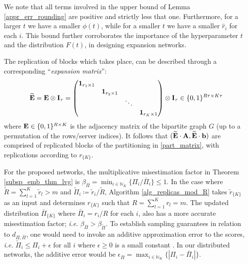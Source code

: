 \documentclass[journal,letterpaper,onecolumn,twoside,nofonttune]{IEEEtran}
\newcommand{\N}{\mathbb{N}}
\newcommand{\R}{\mathbb{R}}
\newcommand{\bb}{\bold{b}}
\newcommand{\Ab}{\bold{A}}
\newcommand{\Eb}{\bold{E}}
\newcommand{\Ebwt}{\widetilde{\bold{E}}}
\newcommand{\Ib}{\bold{I}}
\newcommand{\Rt}{\tilde{R}}
\newcommand{\rh}{\hat{r}}
\newcommand{\rt}{\tilde{r}}
\newcommand{\Pib}{\bar{\Pi}}
\newcommand{\Pit}{\tilde{\Pi}}
\begin{document}
We note that all terms involved in the upper bound of Lemma \ref{appr_err_rounding} are positive and strictly less that one. Furthermore, for a larger $t$ we have a smaller $\phi(t)$, while for a smaller $t$ we have a smaller $\rh_i$ for each $i$. This bound further corroborates the importance of the hyperparameter $t$ and the distribution $F(t)$, in designing expansion networks.

The replication of blocks which takes place, can be described through a corresponding ``\textit{expansion matrix}'':
\begin{equation}
\label{expansion_matrix}
  \Ebwt = \Eb\otimes\Ib_\tau = \begin{pmatrix} \bold{1}_{r_1\times 1} & & & \\ & \bold{1}_{r_2\times 1} & & \\ & & \ddots & \\ & & & \bold{1}_{r_K\times 1} \end{pmatrix} \otimes\Ib_\tau \in \{0,1\}^{R\tau\times K\tau}
\end{equation}
where $\Eb\in\{0,1\}^{R\times K}$ is the adjacency matrix of the bipartite graph $G$ (up to a permutation of the rows/server indices). It follows that $(\Ebwt\cdot\Ab,\Ebwt\cdot\bb)$ are comprised of replicated blocks of the partitioning in \eqref{part_matrix}, with replications according to $r_{\{K\}}$.%

For the proposed networks, the multiplicative misestimation factor in Theorem \ref{subsp_emb_thm_lvg} is $\beta_{\Pib}=\min_{i\in\N_K}\{\Pi_i/\Pib_i\}\leqslant1$. In the case where $\Rt=\sum_{l=1}^K\rt_l>m$ and $\Pit_i\coloneqq\rt_i/\Rt$, Algorithm \ref{alg_replicas_mod_R} takes $\rt_{\{K\}}$ as an input and determines $r_{\{K\}}$ such that $R=\sum_{l=1}^Kr_l=m$. The updated distribution $\Pib_{\{K\}}$ where $\Pib_i=r_i/R$ for each $i$, also has a more accurate misestimation factor; \textit{i.e.} $\beta_{\Pib}>\beta_{\Pit}$. To establish sampling guarantees in relation to $d_{\Pi,\Pib}$, one would need to invoke an additive approximation error to the scores, \textit{i.e.} $\Pit_i\leqslant \Pi_i+\epsilon$ for all $i$ where $\epsilon\geqslant0$ is a small constant \cite{CLMMPS15,DMMW12}. In our distributed networks, the additive error would be $\epsilon_{\Pib}=\max_{i\in\N_K}\{|\Pi_i-\Pib_i|\}$.
\end{document}
